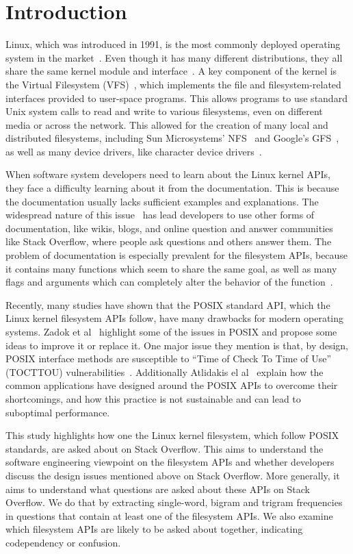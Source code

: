 \section{Introduction}\label{sec:introductio}
Linux, which was introduced in 1991, is the most commonly deployed operating system in the market~\cite{Love2010}. Even though it has many different distributions, they all share the same kernel module and interface~\cite{Bovet2006}. A key component of the kernel is the Virtual Filesystem (VFS)~\cite{Sandberg1988}, which implements the file and filesystem-related interfaces provided to user-space programs. This allows programs to use standard Unix system calls to read and write to various filesystems, even on different media or across the network. This allowed for the creation of many local and distributed filesystems, including Sun Microsystems' NFS~\cite{Sandberg1988} and Google's GFS~\cite{Ghemawat2003}, as well as many device drivers, like character device drivers~\cite{Salzman2009, Corbet2005}.

When software system developers need to learn about the Linux kernel APIs, they face a difficulty learning about it from the documentation. This is because the documentation usually lacks sufficient examples and explanations. The widespread nature of this issue~\cite{Lethbridge2003, Robillard2009} has lead developers to use other forms of documentation, like wikis, blogs, and online question and answer communities like Stack Overflow, where people ask questions and others answer them.
The problem of documentation is especially prevalent for the filesystem APIs, because it contains many functions which seem to share the same goal, as well as many flags and arguments which can completely alter the behavior of the function~\cite{Love2010}.

Recently, many studies have shown that the POSIX standard API, which the Linux kernel filesystem APIs follow, have many drawbacks for modern operating systems. Zadok et al~\cite{Zadok2017} highlight some of the issues in POSIX and propose some ideas to improve it or replace it. One major issue they mention is that, by design, POSIX interface methods are susceptible to ``Time of Check To Time of Use'' (TOCTTOU) vulnerabilities~\cite{Wei2005}. Additionally Atlidakis el al~\cite{Atlidakis2016} explain how the common applications have designed around the POSIX APIs to overcome their shortcomings, and how this practice is not sustainable and can lead to suboptimal performance.

This study highlights how one the Linux kernel filesystem, which follow POSIX standards, are asked about on Stack Overflow. This aims to understand the software engineering viewpoint on the filesystem APIs and whether developers discuss the design issues mentioned above on Stack Overflow. More generally, it aims to understand what questions are asked about these APIs on Stack Overflow. We do that by extracting single-word, bigram and trigram frequencies in questions that contain at least one of the filesystem APIs. We also examine which filesystem APIs are likely to be asked about together, indicating codependency or confusion.


